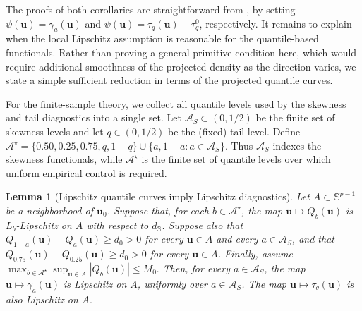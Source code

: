 \documentclass[11pt]{article}
\theoremstyle{plain}
\newtheorem{lemma}{Lemma}
\theoremstyle{definition}
\theoremstyle{remark}
\def\u{\bm{u}}
\newcommand{\abs}[1]{\left\lvert #1 \right\rvert}
\begin{document}

The proofs of both corollaries are straightforward from , by setting \(\psi(\u)=\gamma_{a}(\u)\) and \(\psi(\u)=\tau_q(\u)-\tau_q^0\), respectively. It remains to explain when the local Lipschitz assumption is reasonable for the quantile-based functionals. Rather than proving a general primitive condition here, which would require additional smoothness of the projected density as the direction varies, we state a simple sufficient reduction in terms of the projected quantile curves. 

For the finite-sample theory, we collect all quantile levels used by the skewness and tail diagnostics into a single set. Let \(\mathcal A_S\subset(0,1/2)\) be the finite set of skewness levels and let \(q\in(0,1/2)\) be the (fixed) tail level. Define \(\mathcal A^\star = \{0.50,0.25,0.75,q,1-q\} \cup \{a,1-a:a\in\mathcal A_S\}.\) Thus \(\mathcal A_S\) indexes the skewness functionals, while \(\mathcal A^\star\) is the finite set of quantile levels over which uniform empirical control is required.

\begin{lemma}[Lipschitz quantile curves imply Lipschitz diagnostics]
	\label{lem:lipschitz_bowley_tail}
	Let \(A\subset \mathbb{S}^{p-1}\) be a neighborhood of \(\u_0\). Suppose that, for each \(b\in\mathcal A^\star\), the map \(\u\mapsto Q_b(\u)\) is \(L_b\)-Lipschitz on \(A\) with respect to \(d_{\mathbb S}\). Suppose also that \(Q_{1-a}(\u)-Q_a(\u) \geqslant d_0>0 \) for every \(\u\in A\) and every \(a\in\mathcal A_S\), and that \(Q_{0.75}(\u)-Q_{0.25}(\u)\geqslant d_0>0\) for every \(\u\in A\). Finally, assume \(\max_{b\in\mathcal A^\star}\sup_{\u\in A} \abs{Q_b(\u)} \leqslant M_0. \) Then, for every \(a\in\mathcal A_S\), the map \(\u\mapsto\gamma_{a}(\u)\) is Lipschitz on \(A\), uniformly over \(a\in\mathcal A_S\). The map \(\u\mapsto\tau_q(\u)\) is also Lipschitz on \(A\).
\end{lemma}
\end{document}
